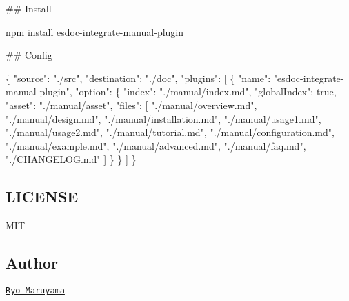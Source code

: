 \#\# Install 
\begin{DoxyCode}
npm install esdoc-integrate-manual-plugin
\end{DoxyCode}


\#\# Config 
\begin{DoxyCode}
\{
  "source": "./src",
  "destination": "./doc",
  "plugins": [
    \{
      "name": "esdoc-integrate-manual-plugin",
      "option": \{
        "index": "./manual/index.md",
        "globalIndex": true,
        "asset": "./manual/asset",
        "files": [
          "./manual/overview.md",
          "./manual/design.md",
          "./manual/installation.md",
          "./manual/usage1.md",
          "./manual/usage2.md",
          "./manual/tutorial.md",
          "./manual/configuration.md",
          "./manual/example.md",
          "./manual/advanced.md",
          "./manual/faq.md",
          "./CHANGELOG.md"
        ]
      \}
    \}
  ]
\}
\end{DoxyCode}


\subsection*{L\+I\+C\+E\+N\+SE}

M\+IT

\subsection*{Author}

\href{https://github.com/h13i32maru}{\tt Ryo Maruyama} 